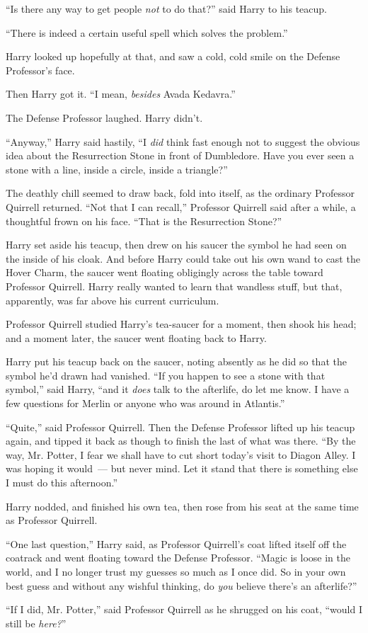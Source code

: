 ``Is there any way to get people \emph{not} to do that?'' said Harry to his teacup.

``There is indeed a certain useful spell which solves the problem.''

Harry looked up hopefully at that, and saw a cold, cold smile on the Defense Professor's face.

Then Harry got it. ``I mean, \emph{besides} Avada Kedavra.''

The Defense Professor laughed. Harry didn't.

``Anyway,'' Harry said hastily, ``I \emph{did} think fast enough not to suggest the obvious idea about the Resurrection Stone in front of Dumbledore. Have you ever seen a stone with a line, inside a circle, inside a triangle?''

The deathly chill seemed to draw back, fold into itself, as the ordinary Professor Quirrell returned. ``Not that I can recall,'' Professor Quirrell said after a while, a thoughtful frown on his face. ``That is the Resurrection Stone?''

Harry set aside his teacup, then drew on his saucer the symbol he had seen on the inside of his cloak. And before Harry could take out his own wand to cast the Hover Charm, the saucer went floating obligingly across the table toward Professor Quirrell. Harry really wanted to learn that wandless stuff, but that, apparently, was far above his current curriculum.

Professor Quirrell studied Harry's tea-saucer for a moment, then shook his head; and a moment later, the saucer went floating back to Harry.

Harry put his teacup back on the saucer, noting absently as he did so that the symbol he'd drawn had vanished. ``If you happen to see a stone with that symbol,'' said Harry, ``and it \emph{does} talk to the afterlife, do let me know. I have a few questions for Merlin or anyone who was around in Atlantis.''

``Quite,'' said Professor Quirrell. Then the Defense Professor lifted up his teacup again, and tipped it back as though to finish the last of what was there. ``By the way, Mr. Potter, I fear we shall have to cut short today's visit to Diagon Alley. I was hoping it would~--- but never mind. Let it stand that there is something else I must do this afternoon.''

Harry nodded, and finished his own tea, then rose from his seat at the same time as Professor Quirrell.

``One last question,'' Harry said, as Professor Quirrell's coat lifted itself off the coatrack and went floating toward the Defense Professor. ``Magic is loose in the world, and I no longer trust my guesses so much as I once did. So in your own best guess and without any wishful thinking, do \emph{you} believe there's an afterlife?''

``If I did, Mr. Potter,'' said Professor Quirrell as he shrugged on his coat, ``would I still be \emph{here?}''
